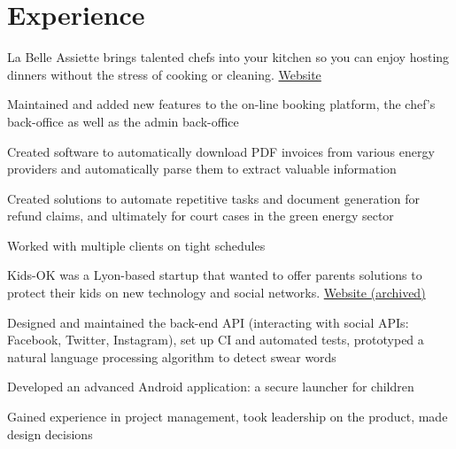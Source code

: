 \documentclass[]{resume-openfont}
\begin{document}
\begin{minipage}[t]{0.66\textwidth}


\section{Experience}
%
%
La Belle Assiette brings talented chefs into your kitchen so you can enjoy hosting dinners without the stress of cooking or cleaning. \href{https://labelleassiette.co.uk}{Website}
\vspace{1.5\topsep} %
\begin{tightemize}
\item Maintained and added new features to the on-line booking platform, the chef's back-office as well as the admin back-office
\end{tightemize}
\sectionsep

%
%
\vspace{\topsep}
\begin{tightemize}
\item Created software to automatically download PDF invoices from various energy providers and automatically parse them to extract valuable information
\item Created solutions to automate repetitive tasks and document generation for refund claims, and ultimately for court cases in the green energy sector
\item Worked with multiple clients on tight schedules
\end{tightemize}
\sectionsep

%
%
Kids-OK was a Lyon-based startup that wanted to offer parents solutions to protect their kids on new technology and social networks. \href{https://i.imgur.com/ZAXWuZN.png}{Website (archived)}
\vspace{\topsep}
\begin{tightemize}
\item Designed and maintained the back-end API (interacting with social APIs: Facebook, Twitter, Instagram), set up CI and automated tests, prototyped a natural language processing algorithm to detect swear words
\item Developed an advanced Android application: a secure launcher for children
\item Gained experience in project management, took leadership on the product, made design decisions
\end{tightemize}
\sectionsep


\end{minipage}
\end{document}
